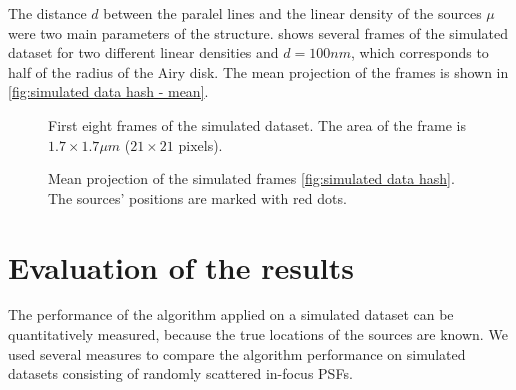 The distance $d$ between the paralel lines and the linear density of the sources $\mu$ were two main parameters of the structure.  shows several frames of the simulated dataset for two different linear densities and $d=100\unit{nm}$, which corresponds to half of the radius of the Airy disk. The mean projection of the frames is shown in \autoref{fig:simulated data hash - mean}.
%
\begin{figure}[!htb]	
	\newcommand{\widthfig}{1\textwidth}
	\centering	
	
	
	\caption{First eight frames of the simulated dataset. The area of the frame is $1.7\times1.7\unit{\mu m}$ ($21\times21$ pixels).}
	\label{fig:simulated data hash}
\end{figure} 
%
\begin{figure}[!htb]	
	\newcommand{\widthfig}{.4\textwidth}
	\centering	
	\hspace{.3cm}	
	\caption{Mean projection of the simulated frames \autoref{fig:simulated data hash}. The sources' positions are marked with red dots.}
	\label{fig:simulated data hash - mean}
\end{figure} 


\clearpage
\section{Evaluation of the results\label{sec:evaluation}}

The performance of the algorithm applied on a simulated dataset can be quantitatively measured, because the true locations of the sources are known. We used several measures to compare the algorithm performance on simulated datasets consisting of randomly scattered in-focus PSFs. 

